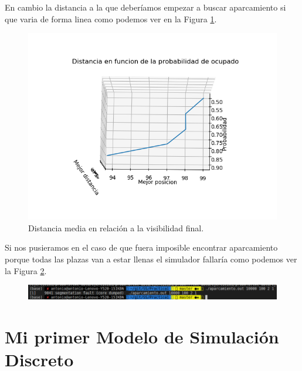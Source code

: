 \documentclass[12pt,a4paper]{article}
\begin{document}
En cambio la distancia a la que deberíamos empezar a buscar aparcamiento si que varia de forma linea como podemos ver en la Figura \ref{fig:distProbabilidad2}.
\begin{figure}[H]
	\centering
	\includegraphics{images/prob2.png}
	\caption{Distancia media en relación a la visibilidad final.}
	\label{fig:distProbabilidad2}
\end{figure}
Si nos pusieramos en el caso de que fuera imposible encontrar aparcamiento porque todas las plazas van a estar llenas el simulador fallaría como podemos ver la Figura \ref{fig:falloej1}.
\begin{figure}[H]
	\centering
	\includegraphics[width=0.7\linewidth]{images/falloej1}
	\caption{}
	\label{fig:falloej1}
\end{figure}
\section{Mi primer Modelo de Simulación Discreto}
\end{document}
